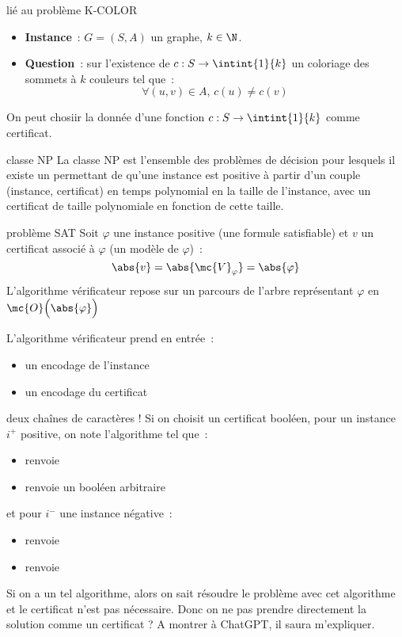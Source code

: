 \begin{adjustwidth}{-3cm}{-3cm}
\begin{exemple}{}{lié au problème K-COLOR}
    \begin{itemize}
        \item \textbf{Instance}~: $G=(S,A)$ un graphe, $k \in \N$.
        \item \textbf{Question}~: sur l'existence de $c:S\to \intint{1}{k}$ un coloriage des sommets à $k$ couleurs tel que~:
        $$\forall (u,v) \in A,\, c(u) \neq c(v)$$
    \end{itemize}
    On peut chosiir la donnée d'une fonction $c:S\to\intint{1}{k}$ comme certificat.
\end{exemple}

\begin{definition}{}{classe NP}
    La classe NP est l'ensemble des problèmes de décision pour lesquels il existe un  permettant de  qu'une instance est positive à partir d'un couple (instance, certificat) en temps polynomial en la taille de l'instance, avec un certificat de taille polynomiale en fonction de cette taille.
\end{definition}

\begin{exemple}{}{problème SAT}
    Soit $\varphi$ une instance positive (une formule satisfiable) et $v$ un certificat associé à $\varphi$ (un modèle de $\varphi$)~:
    $$\abs{v} = \abs{\mc{V}_\varphi} = \abs{\varphi}$$
    L'algorithme vérificateur repose sur un parcours de l'arbre représentant $\varphi$ en $\mc{O}\Big(\abs{\varphi}\Big)$
\end{exemple}

\begin{remarque}{}{}
    L'algorithme vérificateur prend en entrée~:
    \begin{itemize}
        \item un encodage de l'instance
        \item un encodage du certificat
    \end{itemize}
    deux chaînes de caractères ! Si on choisit un certificat booléen, pour un instance $i^+$ positive, on note  l'algorithme tel que~:
    \begin{itemize}
        \item {} renvoie 
        \item {} renvoie un booléen arbitraire
    \end{itemize}
    et pour $i^-$ une instance négative~:
    \begin{itemize}
        \item {} renvoie 
        \item {} renvoie 
    \end{itemize}
    Si on a un tel algorithme, alors on sait résoudre le problème avec cet algorithme et le certificat n'est pas nécessaire. Donc on ne pas prendre directement la solution comme un certificat ? 
    A montrer à ChatGPT, il saura m'expliquer.
\end{remarque}


\end{adjustwidth}
